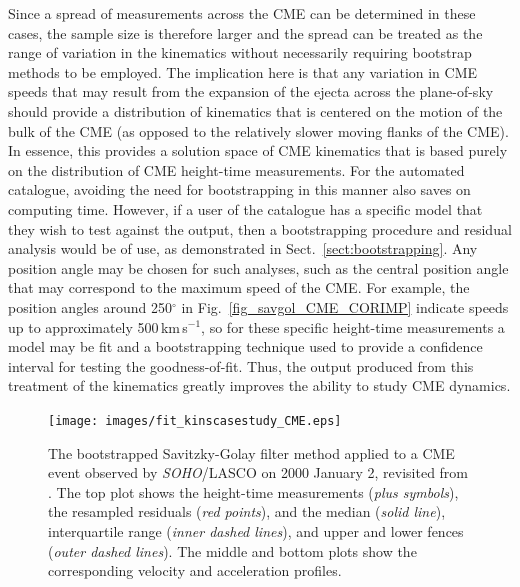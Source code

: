 \documentclass[structabstract]{aa}
\begin{document}
Since a spread of measurements across the CME can be determined in these cases, the sample size is therefore larger and the spread can be treated as the range of variation in the kinematics without necessarily requiring bootstrap methods to be employed. The implication here is that any variation in CME speeds that may result from the expansion of the ejecta across the plane-of-sky should provide a distribution of kinematics that is centered on the motion of the bulk of the CME (as opposed to the relatively slower moving flanks of the CME). In essence, this provides a solution space of CME kinematics that is based purely on the distribution of CME height-time measurements. For the automated catalogue, avoiding the need for bootstrapping in this manner also saves on computing time. However, if a user of the catalogue has a specific model that they wish to test against the output, then a bootstrapping procedure and residual analysis would be of use, as demonstrated in Sect.~\ref{sect:bootstrapping}. Any position angle may be chosen for such analyses, such as the central position angle that may correspond to the maximum speed of the CME. For example, the position angles around 250$^{\circ}$ in Fig.~\ref{fig_savgol_CME_CORIMP} indicate speeds up to approximately 500\,km\,s$^{-1}$, so for these specific height-time measurements a model may be fit and a bootstrapping technique used to provide a confidence interval for testing the goodness-of-fit. Thus, the output produced from this treatment of the kinematics greatly improves the ability to study CME dynamics.

\begin{figure}[!t]
\centering
\texttt{[image: images/fit\_kinscasestudy\_CME.eps]}
\caption{The bootstrapped Savitzky-Golay filter method applied to a CME event observed by \emph{SOHO}/LASCO on 2000 January 2, revisited from \citet{2009A&A...495..325B}. The top plot shows the height-time measurements (\emph{plus symbols}), the resampled residuals (\emph{red points}), and the median (\emph{solid line}), interquartile range (\emph{inner dashed lines}), and upper and lower fences (\emph{outer dashed lines}). The middle and bottom plots show the corresponding velocity and acceleration profiles.}
\label{fig_savgol_CME}
\end{figure}
\end{document}
